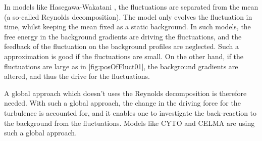 In models like Hasegawa-Wakatani \cite{Hasegawa1987,Holland2007}, the fluctuations are separated from the mean (a so-called Reynolds decomposition).
The model only evolves the fluctuation in time, whilst keeping the mean fixed as a static background.
In such models, the free energy in the background gradients are driving the fluctuations, and the feedback of the fluctuation on the background profiles are neglected.
Such a approximation is good if the fluctuations are small.
On the other hand, if the fluctuations are large as in \cref{fig:posOfFluct01}, the background gradients are altered, and thus the drive for the fluctuations.

A global approach which doesn't uses the Reynolds decomposition is therefore needed.
With such a global approach, the change in the driving force for the turbulence is accounted for, and it enables one to investigate the back-reaction to the background from the fluctuations.
Models like CYTO \cite{Naulin2008,Windisch2011a,Windisch2011b} and CELMA are using such a global approach.

